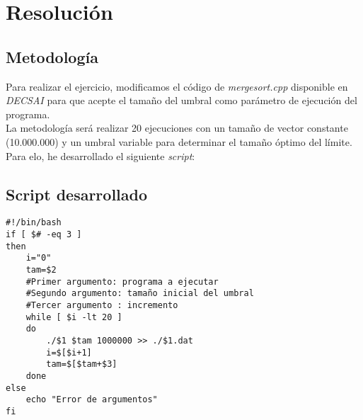 \documentclass[12pt,spanish]{article}
\begin{document}
\section{Resolución}

\subsection{Metodología}
Para realizar el ejercicio, modificamos el código de \emph{mergesort.cpp} disponible en \emph{DECSAI} para que acepte el tamaño del umbral como parámetro de ejecución del programa.\\
La metodología será realizar 20 ejecuciones con un tamaño de vector constante (10.000.000) y un umbral variable para determinar el tamaño óptimo del límite.\\
Para elo, he desarrollado el siguiente \textit{script}:
\subsection{Script desarrollado}
\begin{verbatim}
#!/bin/bash
if [ $# -eq 3 ]
then
	i="0"
	tam=$2
	#Primer argumento: programa a ejecutar
	#Segundo argumento: tamaño inicial del umbral
	#Tercer argumento : incremento
	while [ $i -lt 20 ]
	do
		./$1 $tam 1000000 >> ./$1.dat
		i=$[$i+1]
		tam=$[$tam+$3]
	done
else
	echo "Error de argumentos"
fi
\end{verbatim}
\end{document}
